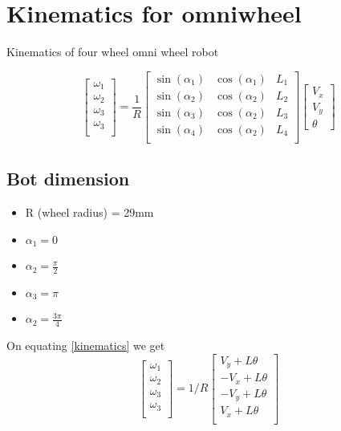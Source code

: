 \documentclass[a4paper]{article}
\begin{document}

\section{Kinematics for omniwheel }
Kinematics of four wheel omni wheel robot

\begin{equation}\label{kinematics}   
    \begin{bmatrix}
		\omega_1 \\
		\omega_2 \\
		\omega_3 \\
		\omega_3 \\
	\end{bmatrix}
	=\frac{1}{R}
	\begin{bmatrix}
		\sin(\alpha_1) & \cos(\alpha_1) & L_1 \\
		\sin(\alpha_2) & \cos(\alpha_2) & L_2 \\
		\sin(\alpha_3) & \cos(\alpha_2) & L_3 \\
		\sin(\alpha_4) & \cos(\alpha_2) & L_4 \\
	\end{bmatrix}
	\begin{bmatrix}
		V_x \\
		V_y \\
		\theta
	\end{bmatrix}
\end{equation}
\subsection{Bot dimension}
\begin{itemize}
	\item R (wheel radius) = 29mm
	\item $\alpha_1 = 0 $
	\item $\alpha_2 = \frac{\pi}{2} $
	\item $\alpha_3 = \pi $
	\item $\alpha_2 = \frac{3\pi}{4} $
\end{itemize}
On equating \ref{kinematics} we get
\begin{equation}
	\begin{bmatrix}
		\omega_1 \\
		\omega_2 \\
		\omega_3 \\
		\omega_3 \\
	\end{bmatrix}
	= 1/R \begin{bmatrix}
		V_y + L \theta  \\
		-V_x + L \theta  \\
		-V_y + L \theta \\
		V_x + L \theta \\
	\end{bmatrix}
\end{equation}
\end{document}
